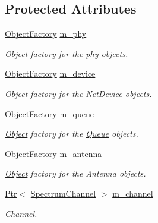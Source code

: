 \subsection*{Protected Attributes}
\begin{DoxyCompactItemize}
\item 
\hyperlink{classns3_1_1ObjectFactory}{Object\+Factory} \hyperlink{classns3_1_1AdhocAlohaNoackIdealPhyHelper_a808515d2431684570b6ad48f23099503}{m\+\_\+phy}
\begin{DoxyCompactList}\small\item\em \hyperlink{classns3_1_1Object}{Object} factory for the phy objects. \end{DoxyCompactList}\item 
\hyperlink{classns3_1_1ObjectFactory}{Object\+Factory} \hyperlink{classns3_1_1AdhocAlohaNoackIdealPhyHelper_a96861b31b956411f79c5585aca553bc7}{m\+\_\+device}
\begin{DoxyCompactList}\small\item\em \hyperlink{classns3_1_1Object}{Object} factory for the \hyperlink{classns3_1_1NetDevice}{Net\+Device} objects. \end{DoxyCompactList}\item 
\hyperlink{classns3_1_1ObjectFactory}{Object\+Factory} \hyperlink{classns3_1_1AdhocAlohaNoackIdealPhyHelper_a1c16959865db59cf9048a872d5b99328}{m\+\_\+queue}
\begin{DoxyCompactList}\small\item\em \hyperlink{classns3_1_1Object}{Object} factory for the \hyperlink{classns3_1_1Queue}{Queue} objects. \end{DoxyCompactList}\item 
\hyperlink{classns3_1_1ObjectFactory}{Object\+Factory} \hyperlink{classns3_1_1AdhocAlohaNoackIdealPhyHelper_a932538c358299d313ca1b15348df6ea0}{m\+\_\+antenna}
\begin{DoxyCompactList}\small\item\em \hyperlink{classns3_1_1Object}{Object} factory for the Antenna objects. \end{DoxyCompactList}\item 
\hyperlink{classns3_1_1Ptr}{Ptr}$<$ \hyperlink{classns3_1_1SpectrumChannel}{Spectrum\+Channel} $>$ \hyperlink{classns3_1_1AdhocAlohaNoackIdealPhyHelper_a3cd17acf9ec7f241a773ecf15482f128}{m\+\_\+channel}
\begin{DoxyCompactList}\small\item\em \hyperlink{classns3_1_1Channel}{Channel}. \end{DoxyCompactList}\item 

\end{DoxyCompactItemize}
